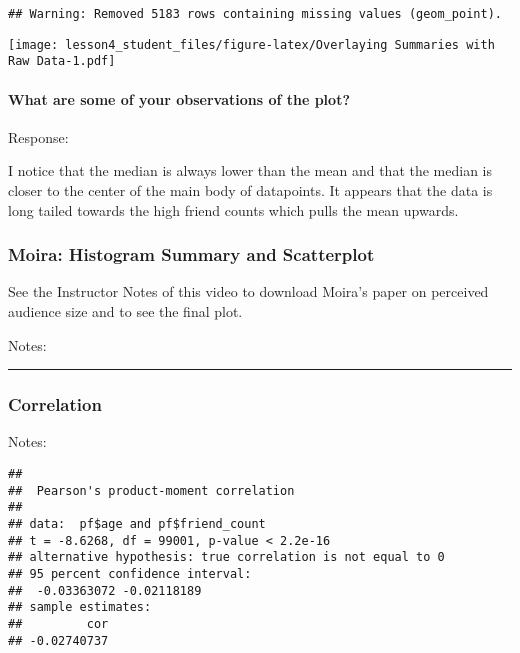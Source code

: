 \documentclass[]{article}
\newenvironment{Shaded}{\begin{snugshade}}{\end{snugshade}}
\newcommand{\KeywordTok}[1]{\textcolor[rgb]{0.13,0.29,0.53}{\textbf{#1}}}
\newcommand{\OperatorTok}[1]{\textcolor[rgb]{0.81,0.36,0.00}{\textbf{#1}}}
\newcommand{\NormalTok}[1]{#1}
\let\oldparagraph\paragraph
\renewcommand{\paragraph}[1]{\oldparagraph{#1}\mbox{}}
\begin{document}
\begin{verbatim}
## Warning: Removed 5183 rows containing missing values (geom_point).
\end{verbatim}

\texttt{[image: lesson4\_student\_files/figure-latex/Overlaying Summaries with Raw Data-1.pdf]}

\paragraph{What are some of your observations of the
plot?}\label{what-are-some-of-your-observations-of-the-plot}

Response:

I notice that the median is always lower than the mean and that the
median is closer to the center of the main body of datapoints. It
appears that the data is long tailed towards the high friend counts
which pulls the mean upwards.

\subsubsection{Moira: Histogram Summary and
Scatterplot}\label{moira-histogram-summary-and-scatterplot}

See the Instructor Notes of this video to download Moira's paper on
perceived audience size and to see the final plot.

Notes:

\begin{center}\rule{0.5\linewidth}{\linethickness}\end{center}

\subsubsection{Correlation}\label{correlation}

Notes:

\begin{Shaded}
\end{Shaded}

\begin{verbatim}
## 
##  Pearson's product-moment correlation
## 
## data:  pf$age and pf$friend_count
## t = -8.6268, df = 99001, p-value < 2.2e-16
## alternative hypothesis: true correlation is not equal to 0
## 95 percent confidence interval:
##  -0.03363072 -0.02118189
## sample estimates:
##         cor 
## -0.02740737
\end{verbatim}
\end{document}
